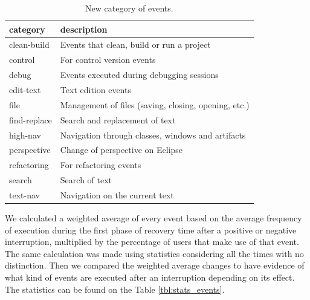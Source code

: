 \documentclass[conference]{IEEEtran}
\begin{document}
\begin{table}[ht!]
\renewcommand{\arraystretch}{1.3}
\caption{New category of events. }
\label{tbl:new_events_udc}
\centering
\begin{tabular}{|p{1.7cm}|p{4 cm}|} 
  \hline 
category & description \\  
  \hline 
    \hline 
clean-build &  Events that clean, build or run a project \\
control & For control version events \\
debug & Events executed during debugging sessions  \\
edit-text & Text edition events  \\
file & Management of files (saving, closing, opening, etc.)  \\
find-replace & Search and replacement of text  \\
high-nav & Navigation through classes, windows and artifacts \\
perspective & Change of perspective on Eclipse  \\
refactoring & For refactoring events \\
search & Search of text  \\
text-nav & Navigation on the current text \\

\hline
\end{tabular}
\end{table}

We calculated a weighted average of every event based on the average frequency of execution during the first phase of recovery time after a positive or negative interruption, multiplied by the percentage of users that make use of that event. The same calculation was made using statistics considering all the times with no distinction. Then we compared the weighted average changes to have evidence of what kind of events are executed after an interruption depending on its effect. The statistics can be found on the Table \ref{tbl:stats_events}.
\end{document}
